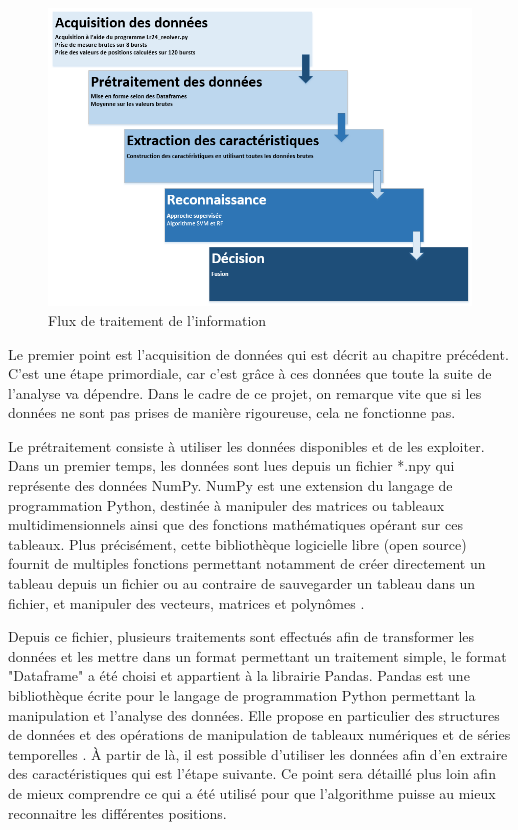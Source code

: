 \begin{figure}[H]
 \begin{center}
  \includegraphics[scale=0.6]{figures/processing.png}
  \caption{Flux de traitement de l'information}
  \label{fig:process} %
 \end{center}
\end{figure}

Le premier point est l'acquisition de données qui est décrit au chapitre précédent. C'est une étape primordiale, car c'est grâce à ces données que toute la suite de l'analyse va dépendre. Dans le cadre de ce projet, on remarque vite que si les données ne sont pas prises de manière rigoureuse, cela ne fonctionne pas.

Le prétraitement consiste à utiliser les données disponibles et de les exploiter. Dans un premier temps, les données sont lues depuis un fichier *.npy qui représente des données NumPy. NumPy est une extension du langage de programmation Python, destinée à manipuler des matrices ou tableaux multidimensionnels ainsi que des fonctions mathématiques opérant sur ces tableaux. Plus précisément, cette bibliothèque logicielle libre (open source) fournit de multiples fonctions permettant notamment de créer directement un tableau depuis un fichier ou au contraire de sauvegarder un tableau dans un fichier, et manipuler des vecteurs, matrices et polynômes \cite{WIKI2}. 

Depuis ce fichier, plusieurs traitements sont effectués afin de transformer les données et les mettre dans un format permettant un traitement simple, le format "Dataframe" a été choisi et appartient à la librairie Pandas. Pandas est une bibliothèque écrite pour le langage de programmation Python permettant la manipulation et l'analyse des données. Elle propose en particulier des structures de données et des opérations de manipulation de tableaux numériques et de séries temporelles \cite{WIKI3}. À partir de là, il est possible d'utiliser les données afin d'en extraire des caractéristiques qui est l'étape suivante. Ce point sera détaillé plus loin afin de mieux comprendre ce qui a été utilisé pour que l'algorithme puisse au mieux reconnaitre les différentes positions. 


